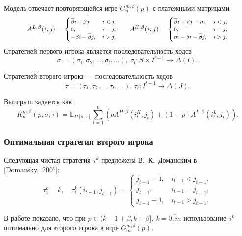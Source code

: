 \documentclass[12pt]{beamer}
\newcommand{\Co}{\beta}
\newcommand{\DCo}{\overline{\beta}}
\newcommand{\E}{\ensuremath{\mathbb{E}}}
\begin{document}
\begin{frame}
  Модель отвечает повторяющейся игре $G^{m, \Co}_n(p)$ с платежными матрицами
  \begin{equation*}\footnotesize
    A^{L,\Co}(i, j) = \begin{cases}
      \DCo i + \Co j, &\, i < j, \\
      0, &\, i = j, \\
      -\Co i - \DCo j, &\, i > j,
    \end{cases}
    \qquad
    A^{H,\Co}(i, j) = \begin{cases}
      \DCo i + \Co j - m, &\, i < j, \\
      0, &\, i = j, \\
      m - \Co i - \DCo j, &\, i > j.
    \end{cases}
  \end{equation*}
  Стратегией первого игрока является последовательность ходов 
  \[
  \sigma = (\sigma_1, \sigma_2, \ldots, \sigma_t, \ldots),\ \sigma_t: S \times I^{t-1} \rightarrow \Delta(I).
  \]

  Стратегией второго игрока --- последовательность ходов 
  \[
  \tau = (\tau_1, \tau_2, \ldots, \tau_t, \ldots),\ \tau_t: I^{t-1} \rightarrow \Delta(J).
  \]

  Выигрыш задается как
  \begin{equation*}
    K^{m,\Co}_n(p, \sigma, \tau) = \E_{\Pi[\sigma,\tau]} \sum_{t=1}^n
    \left(
      pA^{H,\Co}(i_t^H, j_t) + (1 - p)A^{L,\Co}(i_t^L, j_t)
    \right).
  \end{equation*}
\end{frame}

\begin{frame}
  \frametitle{Оптимальная стратегия второго игрока}
  
  Следующая чистая стратегия $\tau^k$ предложена В.~К.~Доманским в [Domansky,~2007]:
  \[
    \tau^k_1 = k, \quad \tau^k_t(i_{t-1}, j_{t-1}) = \begin{cases}
      j_{t-1} - 1, & \, i_{t-1} < j_{t-1}, \\
      j_{t-1},     & \, i_{t-1} = j_{t-1}, \\
      j_{t-1} + 1, & \, i_{t-1} > j_{t-1}.
    \end{cases}
  \]
  
  В работе показано, что при $p \in (k - 1 + \Co, k + \Co],\ k = \overline{0, m}$ использование $\tau^k$ оптимально для второго игрока в игре $G^{m, \Co}_\infty(p)$.
\end{frame}
\end{document}
